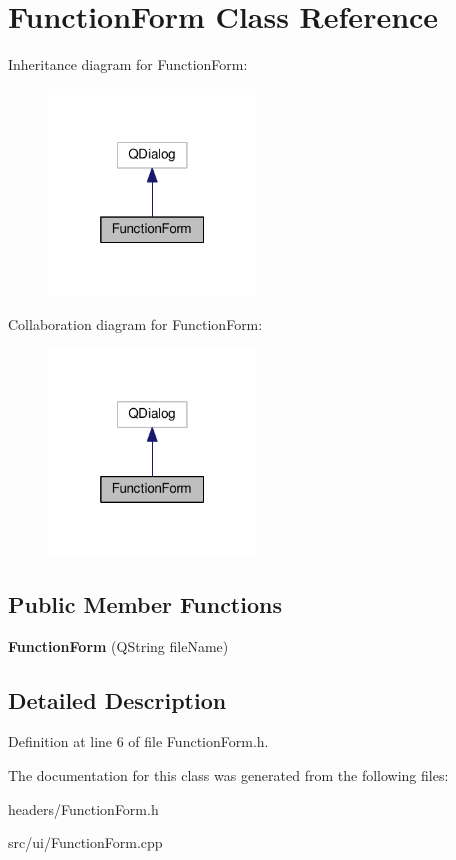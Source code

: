 \hypertarget{classFunctionForm}{\section{Function\+Form Class Reference}
\label{classFunctionForm}
}


Inheritance diagram for Function\+Form\+:\nopagebreak
\begin{figure}[H]
\begin{center}
\leavevmode
\includegraphics[width=157pt]{classFunctionForm__inherit__graph}
\end{center}
\end{figure}


Collaboration diagram for Function\+Form\+:\nopagebreak
\begin{figure}[H]
\begin{center}
\leavevmode
\includegraphics[width=157pt]{classFunctionForm__coll__graph}
\end{center}
\end{figure}
\subsection*{Public Member Functions}
\begin{DoxyCompactItemize}
\item 
\hypertarget{classFunctionForm_ab2be919d4b96f31dc85d8e133dd9bda0}{{\bfseries Function\+Form} (Q\+String file\+Name)}\label{classFunctionForm_ab2be919d4b96f31dc85d8e133dd9bda0}

\end{DoxyCompactItemize}


\subsection{Detailed Description}


Definition at line 6 of file Function\+Form.\+h.



The documentation for this class was generated from the following files\+:\begin{DoxyCompactItemize}
\item 
headers/Function\+Form.\+h\item 
src/ui/Function\+Form.\+cpp\end{DoxyCompactItemize}
